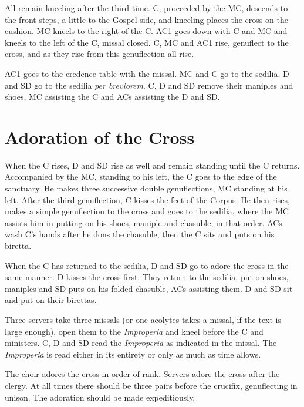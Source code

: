 {    \rubric All remain kneeling after the third time. C, proceeded by the MC,
    descends to the front steps, a little to the Gospel side, and kneeling
    places the cross on the cushion. MC kneels to the right of the C. AC1 goes
    down with C and MC and kneels to the left of the C, missal closed. C, MC
    and AC1 rise, genuflect to the cross, and as they rise from this
    genuflection all rise.

    \rubric AC1 goes to the credence table with the missal. MC and C go to the
    sedilia. D and SD go to the sedilia \textit{per breviorem}. C, D and SD
    remove their maniples and shoes, MC assisting the C and ACs assisting the D
    and SD.

    \section{Adoration of the Cross}

    \rubric When the C rises, D and SD rise as well and remain standing until
    the C returns. Accompanied by the MC, standing to his left, the C goes to
    the edge of the sanctuary. He makes three successive double genuflections,
    MC standing at his left. After the third genuflection, C kisses the feet of
    the Corpus. He then rises, makes a simple genuflection to the cross and
    goes to the sedilia, where the MC assists him in putting on his shoes,
    maniple and chasuble, in that order. ACs wash C's hands after he dons the
    chasuble, then the C sits and puts on his biretta.

    \rubric When the C has returned to the sedilia, D and SD go to adore the
    cross in the same manner. D kisses the cross first. They return to the
    sedilia, put on shoes, maniples and SD puts on his folded chasuble, ACs
    assisting them. D and SD sit and put on their birettas.

    \rubric Three servers take three missals (or one acolytes takes a missal,
    if the text is large enough), open them to the \textit{Improperia} and
    kneel before the C and ministers. C, D and SD read the \textit{Improperia}
    as indicated in the missal. The \textit{Improperia} is read either in its
    entirety or only as much as time allows.

    \rubric The choir adores the cross in order of rank. Servers adore the
    cross after the clergy. At all times there should be three pairs before the
    crucifix, genuflecting in unison. The adoration should be made
    expeditiously.

}
